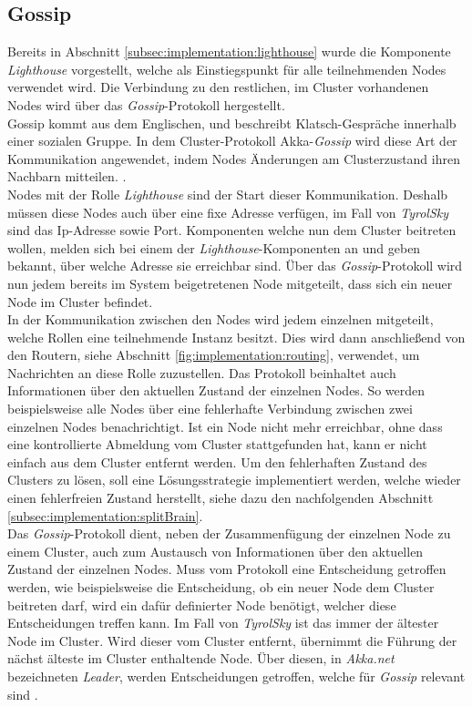 \subsection{Gossip}
\label{subsec:implementation:gossip}
Bereits in Abschnitt \ref{subsec:implementation:lighthouse} wurde die Komponente \textit{Lighthouse} vorgestellt, welche als Einstiegspunkt für alle teilnehmenden Nodes verwendet wird. Die Verbindung zu den restlichen, im Cluster vorhandenen Nodes wird über das \textit{Gossip}-Protokoll hergestellt. \\
Gossip kommt aus dem Englischen, und beschreibt Klatsch-Gespräche innerhalb einer sozialen Gruppe. 
In dem Cluster-Protokoll Akka-\textit{Gossip} wird diese Art der Kommunikation angewendet, indem Nodes Änderungen am Clusterzustand ihren Nachbarn mitteilen. \citep{Akka.netCommunityAkka.NETDocumentation}.  \\
Nodes mit der Rolle \textit{Lighthouse} sind der Start dieser Kommunikation. Deshalb müssen diese Nodes auch über eine fixe Adresse verfügen, im Fall von \textit{TyrolSky} sind das Ip-Adresse sowie Port. Komponenten welche nun dem Cluster beitreten wollen, melden sich bei einem der \textit{Lighthouse}-Komponenten an und geben bekannt, über welche Adresse sie erreichbar sind. Über das \textit{Gossip}-Protokoll wird nun jedem bereits im System beigetretenen Node mitgeteilt, dass sich ein neuer Node im Cluster befindet. \\
In der Kommunikation zwischen den Nodes wird jedem einzelnen mitgeteilt, welche Rollen eine teilnehmende Instanz besitzt. Dies wird dann anschließend von den Routern, siehe Abschnitt \ref{fig:implementation:routing}, verwendet, um Nachrichten an diese Rolle zuzustellen. Das Protokoll beinhaltet auch Informationen über den aktuellen Zustand der einzelnen Nodes. So werden beispielsweise alle Nodes über eine fehlerhafte Verbindung zwischen zwei einzelnen Nodes benachrichtigt. Ist ein Node nicht mehr erreichbar, ohne dass eine kontrollierte Abmeldung vom Cluster stattgefunden hat, kann er nicht einfach aus dem Cluster entfernt werden. Um den fehlerhaften Zustand des Clusters zu lösen, soll eine Lösungsstrategie implementiert werden, welche wieder einen fehlerfreien Zustand herstellt, siehe dazu den nachfolgenden Abschnitt \ref{subsec:implementation:splitBrain}. \\ 
Das \textit{Gossip}-Protokoll dient, neben der Zusammenfügung der einzelnen Node zu einem Cluster, auch zum Austausch von Informationen über den aktuellen Zustand der einzelnen Nodes. Muss vom Protokoll eine Entscheidung getroffen werden, wie beispielsweise die Entscheidung,  ob ein neuer Node dem Cluster beitreten darf, wird ein dafür definierter Node benötigt, welcher diese Entscheidungen treffen kann. Im Fall von \textit{TyrolSky} ist das immer der ältester Node im Cluster. Wird dieser vom Cluster entfernt, übernimmt die Führung der nächst älteste im Cluster enthaltende Node. Über diesen, in \textit{Akka.net} bezeichneten \textit{Leader}, werden Entscheidungen getroffen, welche für \textit{Gossip} relevant sind \citep{akkaInAction}.  

